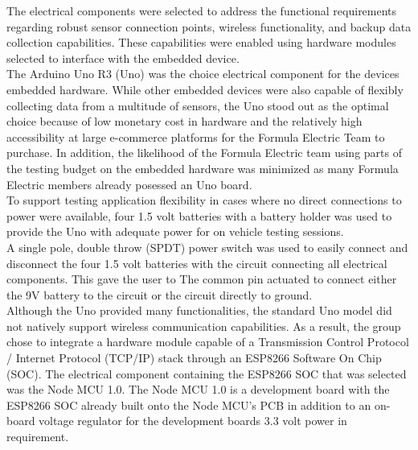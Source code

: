\documentclass[12pt, titlepage]{article}
\begin{document}

The electrical components were selected to address the functional requirements regarding robust sensor connection points, wireless functionality, and backup data collection capabilities. These capabilities were enabled using hardware modules selected to interface with the embedded device. \\

The Arduino Uno R3 (Uno) was the choice electrical component for the devices embedded hardware. While other embedded devices  were also capable of flexibly collecting data from a multitude of sensors, the Uno stood out as the optimal choice because of low monetary cost in hardware and the relatively high accessibility at large e-commerce platforms for the Formula Electric Team to purchase. In addition, the likelihood of the Formula Electric team using parts of the testing budget on the embedded hardware was minimized as many Formula Electric members already posessed an Uno board. \\

To support testing application flexibility in cases where no direct connections to power were available, four 1.5 volt batteries with a battery holder was used to provide the Uno with adequate power for on vehicle testing sessions. \\

A single pole, double throw (SPDT) power switch was used to easily connect and disconnect the four 1.5 volt batteries with the circuit connecting all electrical components. This gave the user to The common pin actuated to connect either the 9V battery to the circuit or the circuit directly to ground. \\

Although the Uno provided many functionalities, the standard Uno model did not natively support wireless communication capabilities. As a result, the group chose to integrate a hardware module capable of a Transmission Control Protocol / Internet Protocol (TCP/IP) stack through an ESP8266 Software On Chip (SOC). The electrical component containing the ESP8266 SOC that was selected was the Node MCU 1.0. The Node MCU 1.0 is a development board with the ESP8266 SOC already built onto the Node MCU's PCB in addition to an on-board voltage regulator for the development boards 3.3 volt power in requirement. \\
\end{document}
